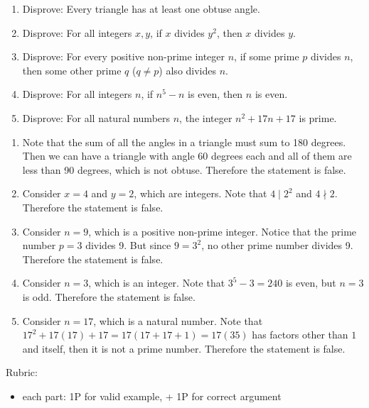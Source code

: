 \documentclass{article}
\theoremstyle{definition}
\begin{document}
\begin{question}{10}
    \begin{enumerate}
        \item Disprove: Every triangle has at least one obtuse angle.
        \item Disprove: For all integers $x, y$, if $x$ divides $y^2$, then $x$ divides $y$.
        \item Disprove: For every positive non-prime integer $n$, if some prime $p$ divides $n$, 
            then some other prime $q$ ($q\neq p$) also divides $n$.
        \item Disprove: For all integers $n$, if $n^5-n$ is even, then $n$ is even.
        \item Disprove: For all natural numbers $n$, the integer $n^2+17n+17$ is prime.
    \end{enumerate}
\end{question}
\begin{solution}
\begin{enumerate}
\item Note that the sum of all the angles in a triangle must sum to 180 degrees. Then we can have a triangle with angle 60 degrees each and all of them are less than 90 degrees, which is not obtuse. Therefore the statement is false.

\item Consider $x=4$ and $y=2$, which are integers. Note that $4 \mid 2^2$ and $4 \nmid 2$. Therefore the statement is false.

\item Consider $n=9$, which is a positive non-prime integer. Notice that the prime number $p=3$ divides 9. But since $9=3^2$, no other prime number divides 9. Therefore the statement is false.

\item Consider $n=3$, which is an integer. Note that $3^5-3=240$ is even, but $n=3$ is odd. Therefore the statement is false.

\item Consider $n=17$, which is a natural number. Note that $17^2 + 17(17) + 17 = 17(17+17+1) = 17(35)$ has factors other than $1$ and itself, then it is not a prime number. Therefore the statement is false.
\end{enumerate}
{\color{red} Rubric:
\begin{itemize}
\item each part: 1P for valid example, + 1P for correct argument
\end{itemize}}
\end{solution}
\end{document}
